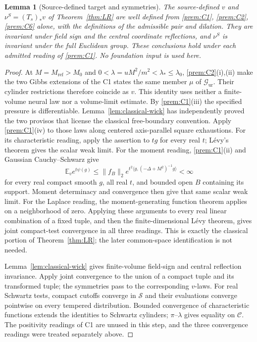 \documentclass[11pt]{article}
\theoremstyle{plain}
\newtheorem{lemma}[theorem]{Lemma}
\theoremstyle{definition}
\theoremstyle{remark}
\newcommand{\E}{\mathbb{E}}
\newcommand{\cC}{\mathcal{C}}
\newcommand{\cG}{\mathcal{G}}
\newcommand{\cS}{\mathcal{S}}
\begin{document}
\begin{lemma}[Source-defined target and symmetries]\label{lem:target-symmetry}
The source-defined $v$ and $\nu^S=(T_s)_*v$ of Theorem~\ref{thm:LR} are
well defined from \ref{prem:C1}, \ref{prem:C2}, \ref{prem:C6} alone,
with the definitions of the admissible pair and dilation. They are invariant
under field sign and the central coordinate reflections, and $\nu^S$ is
invariant under the full Euclidean group. These conclusions hold under
each admitted reading of \ref{prem:C1}. No foundation input is used here.
\end{lemma}
\begin{proof}
At $M=M_{\mathrm{ref}}>M_0$ and
$0<\lambda=uM^2/m^2<\lambda_*\le\lambda_0$, \ref{prem:C2}(i),(ii)
make the two Gibbs extensions of the C1 states the same member $\mu$ of
$\cG_{\mathrm{ur}}$. Their cylinder restrictions therefore coincide as $v$.
This identity uses neither a finite-volume neural law nor a volume-limit
estimate. By \ref{prem:C1}(iii) the specified pressure is differentiable.
Lemma~\ref{lem:classical-wick} has independently proved the two provisos
that license the classical free-boundary convention. Apply \ref{prem:C1}(iv)
to those laws along centered axis-parallel square exhaustions.
For its characteristic reading, apply the assertion to $tg$ for every
real $t$; L\'evy's theorem gives the scalar weak limit. For the moment
reading, \ref{prem:C1}(ii) and Gaussian Cauchy--Schwarz give
\[
 \E_v e^{t\psi(g)}\le\|f_B\|_2
    e^{t^2\langle g,(-\Delta+M^2)^{-1}g\rangle}<\infty
\]
for every real compact smooth $g$, all real $t$, and bounded open $B$
containing its support. Moment determinacy and convergence then give that
same scalar weak limit. For the Laplace reading, the moment-generating
function theorem applies on a neighborhood of zero. Applying these arguments
to every real linear combination of a fixed tuple, and then the
finite-dimensional L\'evy theorem, gives joint compact-test convergence in
all three readings. This is exactly the classical portion of
Theorem~\ref{thm:LR}; the later common-space identification is not needed.

Lemma~\ref{lem:classical-wick} gives finite-volume field-sign and central
reflection invariance. Apply joint convergence to the union of a compact
tuple and its transformed tuple; the symmetries pass to the corresponding
$v$-laws. For real Schwartz tests, compact cutoffs converge in $\cS$ and
their evaluations converge pointwise on every tempered distribution.
Bounded convergence of characteristic functions extends the identities to
Schwartz cylinders; $\pi$--$\lambda$ gives equality on $\cC$.
The positivity readings of C1 are unused in this step, and the three
convergence readings were treated separately above.


\end{proof}
\end{document}
